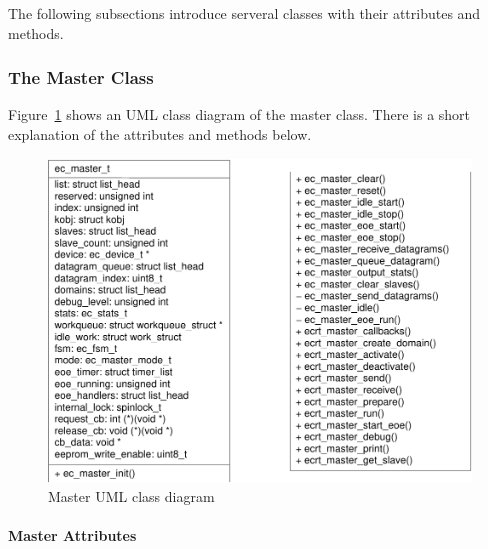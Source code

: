 \documentclass[a4paper,12pt,BCOR6mm,bibtotoc,idxtotoc]{scrbook}
\begin{document}
The following subsections introduce serveral classes with their
attributes and methods.


\subsubsection{The Master Class}
\label{sec:class-master}

Figure~\ref{fig:uml-master} shows an UML class diagram of the master
class. There is a short explanation of the attributes and methods
below.

\begin{figure}[htbp]
  \centering
  \includegraphics[width=.8\textwidth]{images/uml-master}
  \caption{Master UML class diagram}
  \label{fig:uml-master}
\end{figure}

\paragraph{Master Attributes}
\end{document}
